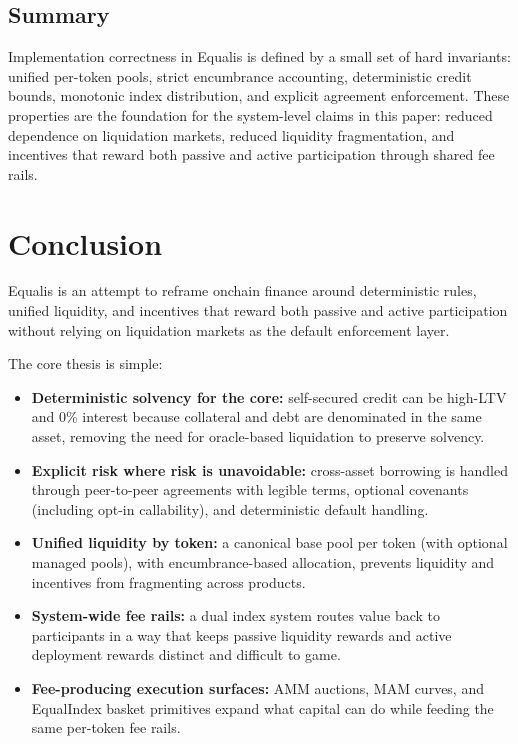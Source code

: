 \documentclass[version=preprint]{iacrcc}
\begin{document}
\subsection{Summary}

Implementation correctness in Equalis is defined by a small set of hard invariants: unified per-token pools, strict encumbrance accounting, deterministic credit bounds, monotonic index distribution, and explicit agreement enforcement. These properties are the foundation for the system-level claims in this paper: reduced dependence on liquidation markets, reduced liquidity fragmentation, and incentives that reward both passive and active participation through shared fee rails.

\section{Conclusion}

Equalis is an attempt to reframe onchain finance around deterministic rules, unified liquidity, and incentives that reward both passive and active participation without relying on liquidation markets as the default enforcement layer.

The core thesis is simple:
\begin{itemize}
  \item \textbf{Deterministic solvency for the core:} self-secured credit can be high-LTV and 0\% interest because collateral and debt are denominated in the same asset, removing the need for oracle-based liquidation to preserve solvency.
  \item \textbf{Explicit risk where risk is unavoidable:} cross-asset borrowing is handled through peer-to-peer agreements with legible terms, optional covenants (including opt-in callability), and deterministic default handling.
  \item \textbf{Unified liquidity by token:} a canonical base pool per token (with optional managed pools), with encumbrance-based allocation, prevents liquidity and incentives from fragmenting across products.
  \item \textbf{System-wide fee rails:} a dual index system routes value back to participants in a way that keeps passive liquidity rewards and active deployment rewards distinct and difficult to game.
  \item \textbf{Fee-producing execution surfaces:} AMM auctions, MAM curves, and EqualIndex basket primitives expand what capital can do while feeding the same per-token fee rails.
\end{itemize}
\end{document}
